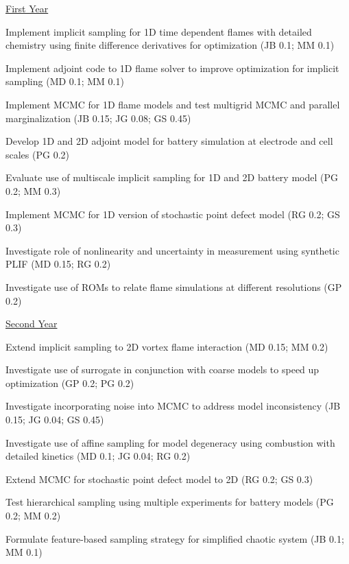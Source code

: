\documentclass[11pt]{article}
\begin{document}
\underline{First Year}
\begin{compactitem}
\setlength{\itemsep}{0pt}\setlength{\parskip}{0pt}\setlength{\parsep}{0pt}
\item Implement implicit sampling for 1D time dependent flames with detailed chemistry using finite difference derivatives for optimization
(JB 0.1; MM 0.1)
\item Implement adjoint code to 1D flame solver to improve optimization for implicit sampling
(MD 0.1; MM 0.1)
\item Implement MCMC for 1D flame models and test multigrid MCMC and parallel marginalization
(JB 0.15; JG 0.08; GS 0.45)
\item Develop 1D and 2D adjoint model for battery simulation at electrode and cell scales
(PG 0.2)
\item Evaluate use of multiscale implicit sampling for 1D and 2D battery model
(PG 0.2; MM 0.3)
\item Implement MCMC for 1D version of stochastic point defect model
(RG 0.2; GS 0.3)
\item Investigate role of nonlinearity and uncertainty in measurement using synthetic PLIF
(MD 0.15; RG 0.2)
\item Investigate use of ROMs to relate flame simulations at different resolutions
(GP 0.2)
\end{compactitem}
%
\underline{Second Year}
\begin{compactitem}
\setlength{\itemsep}{0pt}\setlength{\parskip}{0pt}\setlength{\parsep}{0pt}
\item Extend implicit sampling to 2D vortex flame interaction
(MD 0.15; MM 0.2)
\item Investigate use of surrogate in conjunction with coarse models to speed up optimization
(GP 0.2; PG 0.2)
\item Investigate incorporating noise into MCMC to address model inconsistency
(JB 0.15; JG 0.04; GS 0.45)
\item Investigate use of affine sampling for model degeneracy using combustion with detailed kinetics
(MD 0.1; JG 0.04; RG 0.2)
\item Extend MCMC for stochastic point defect model to 2D
(RG 0.2; GS 0.3)
\item Test hierarchical sampling using multiple experiments for battery models
(PG 0.2; MM 0.2)
\item Formulate feature-based sampling strategy for simplified chaotic system
(JB 0.1; MM 0.1)
\end{compactitem}
%
\end{document}
